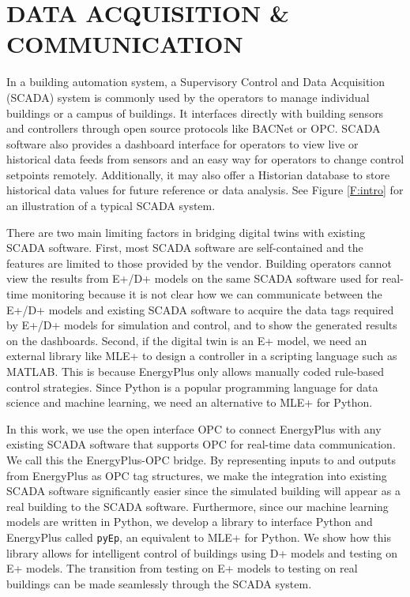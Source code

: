\section{DATA ACQUISITION \& COMMUNICATION}

In a building automation system, a Supervisory Control and Data Acquisition (SCADA) system is commonly used by the operators to manage individual buildings or a campus of buildings. 
It interfaces directly with building sensors and controllers through open source protocols like BACNet or OPC. 
SCADA software also provides a dashboard interface for operators to view live or historical data feeds from sensors and an easy way for operators to change control setpoints remotely. 
Additionally, it may also offer a Historian database to store historical data values for future reference or data analysis.
See Figure \ref{F:intro} for an illustration of a typical SCADA system.

There are two main limiting factors in bridging digital twins with existing SCADA software.
First, most SCADA software are self-contained and the features are limited to those provided by the vendor.
Building operators cannot view the results from E+/D+ models on the same SCADA software used for real-time monitoring because it is not clear how we can communicate between the E+/D+ models and existing SCADA software to acquire the data tags required by E+/D+ models for simulation and control, and to show the generated results on the dashboards.
Second, if the digital twin is an E+ model, we need an external library like MLE+ \cite{bernaletal12mti} to design a controller in a scripting language such as MATLAB.
This is because EnergyPlus only allows manually coded rule-based control strategies.
Since Python is a popular programming language for data science and machine learning, we need an alternative to MLE+ for Python. 

In this work, we use the open interface OPC to connect EnergyPlus with any existing SCADA software that supports OPC for real-time data communication. 
We call this the EnergyPlus-OPC bridge.
By representing inputs to and outputs from EnergyPlus as OPC tag structures, we make the integration into existing SCADA software significantly easier since the simulated building will appear as a real building to the SCADA software.
Furthermore, since our machine learning models are written in Python, we develop a library to interface Python and EnergyPlus called \texttt{pyEp}, an equivalent to MLE+ for Python.
We show how this library allows for intelligent control of buildings using D+ models and testing on E+ models.
The transition from testing on E+ models to testing on real buildings can be made seamlessly through the SCADA system.

